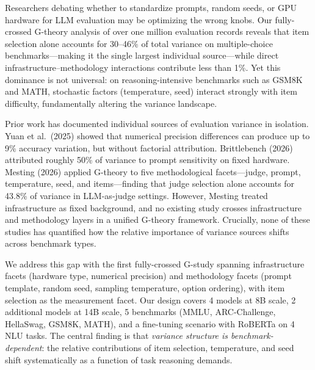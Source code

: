 \documentclass[11pt]{article}
\begin{document}
Researchers debating whether to standardize prompts, random seeds, or GPU hardware for LLM evaluation may be optimizing the wrong knobs.
Our fully-crossed G-theory analysis of over one million evaluation records reveals that item selection alone accounts for 30--46\% of total variance on multiple-choice benchmarks---making it the single largest individual source---while direct infrastructure--methodology interactions contribute less than 1\%.
Yet this dominance is not universal: on reasoning-intensive benchmarks such as GSM8K and MATH, stochastic factors (temperature, seed) interact strongly with item difficulty, fundamentally altering the variance landscape.

Prior work has documented individual sources of evaluation variance in isolation.
Yuan et al.\ (2025) showed that numerical precision differences can produce up to 9\% accuracy variation, but without factorial attribution.
Brittlebench (2026) attributed roughly 50\% of variance to prompt sensitivity on fixed hardware.
Mesting (2026) applied G-theory to five methodological facets---judge, prompt, temperature, seed, and items---finding that judge selection alone accounts for 43.8\% of variance in LLM-as-judge settings.
However, Mesting treated infrastructure as fixed background, and no existing study crosses infrastructure and methodology layers in a unified G-theory framework.
Crucially, none of these studies has quantified how the relative importance of variance sources shifts across benchmark types.

We address this gap with the first fully-crossed G-study spanning infrastructure facets (hardware type, numerical precision) and methodology facets (prompt template, random seed, sampling temperature, option ordering), with item selection as the measurement facet.
Our design covers 4 models at 8B scale, 2 additional models at 14B scale, 5 benchmarks (MMLU, ARC-Challenge, HellaSwag, GSM8K, MATH), and a fine-tuning scenario with RoBERTa on 4 NLU tasks.
The central finding is that \emph{variance structure is benchmark-dependent}: the relative contributions of item selection, temperature, and seed shift systematically as a function of task reasoning demands.
\end{document}
